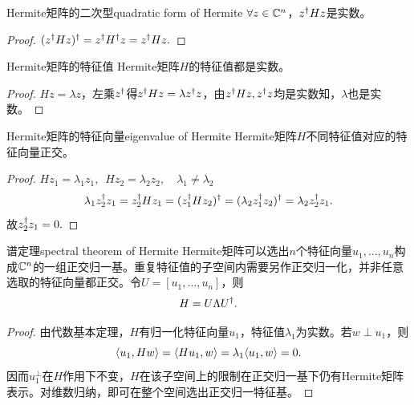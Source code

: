 \begin{theorem}{Hermite矩阵的二次型}{quadratic form of Hermite}
	$\forall z \in \mathbb{C}^n$，$z^\dagger Hz$是实数。
\end{theorem}
\begin{proof}
	$(z^\dagger Hz)^\dagger = z^\dagger H^\dagger z = z^\dagger Hz.$
\end{proof}
\begin{theorem}{Hermite矩阵的特征值}{}
	Hermite矩阵$H$的特征值都是实数。
\end{theorem}
\begin{proof}
	$Hz = \lambda z$，左乘$z^\dagger$得$z^\dagger Hz = \lambda z^\dagger z$，由$z^\dagger Hz,z^\dagger z$均是实数知，$\lambda$也是实数。
\end{proof}
\begin{theorem}{Hermite矩阵的特征向量}{eigenvalue of Hermite}
	Hermite矩阵$H$不同特征值对应的特征向量正交。
\end{theorem}
\begin{proof}
	$Hz_1 = \lambda_1z_1,\enspace Hz_2 = \lambda_2z_2,\quad\lambda_1 \neq \lambda_2$
	\[
		\lambda_1z_2^\dagger z_1 = z_2^\dagger Hz_1 = (z_1^\dagger Hz_2)^\dagger = (\lambda_2z_1^\dagger z_2)^\dagger = \lambda_2z_2^\dagger z_1.
	\]
	故$z_2^\dagger z_1 = 0.$
\end{proof}
\begin{theorem}{谱定理}{spectral theorem of Hermite}
	Hermite矩阵可以选出$n$个特征向量$u_1,\ldots,u_n$构成$\mathbb{C}^n$的一组正交归一基。重复特征值的子空间内需要另作正交归一化，并非任意选取的特征向量都正交。令$U = [u_1,\ldots,u_n]$，则
	\begin{equation}\label{eq:la-hermitian-spectral-theorem}
		H = U\Lambda U^\dagger.
	\end{equation}
\end{theorem}
\begin{proof}
    由代数基本定理，$H$有归一化特征向量$u_1$，特征值$\lambda_1$为实数。若$w \perp u_1$，则
    \[
        \langle u_1,Hw\rangle = \langle Hu_1,w\rangle = \lambda_1\langle u_1,w\rangle = 0.
    \]
    因而$u_1^\perp$在$H$作用下不变，$H$在该子空间上的限制在正交归一基下仍有Hermite矩阵表示。对维数归纳，即可在整个空间选出正交归一特征基。
\end{proof}

